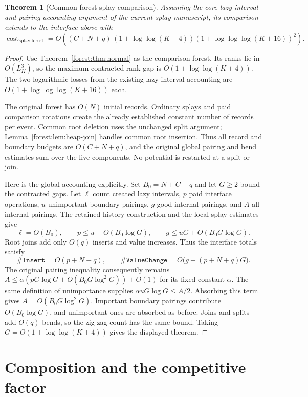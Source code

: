 \documentclass[11pt]{article}
\numberwithin{equation}{section}
\newtheorem{theorem}{Theorem}[section]
\newcommand{\cost}{\operatorname{cost}}
\begin{document}
\begin{theorem}[Common-forest splay comparison]\label{forest:thm:splay}
Assuming the core lazy-interval and pairing-accounting argument of the
current splay manuscript, its comparison extends to the interface above
with
\[
 \cost_{\mathrm{splay\ forest}}
 =O\!\left((C+N+q)\,
   (1+\log\log(K+4))
   (1+\log\log\log(K+16))^2\right).
\]
\end{theorem}

\begin{proof}
Use Theorem~\ref{forest:thm:normal} as the comparison forest. Its ranks lie in
$O(L_K^3)$, so the maximum contracted rank gap is $O(1+\log\log(K+4))$.
The two logarithmic losses from the existing lazy-interval accounting
are $O(1+\log\log\log(K+16))$ each.

The original forest has $O(N)$ initial records. Ordinary splays and
paid comparison rotations create the already established constant
number of records per event. Common root deletion uses the unchanged
split argument; Lemma~\ref{forest:lem:heap-join} handles common root insertion.
Thus all record and boundary budgets are $O(C+N+q)$, and the original
global pairing and bend estimates sum over the live components.
No potential is restarted at a split or join.

Here is the global accounting explicitly. Set $B_0=N+C+q$ and let
$G\ge2$ bound the contracted gaps. Let $\ell$ count created lazy
intervals, $p$ paid interface operations, $u$ unimportant boundary
pairings, $g$ good internal pairings, and $A$ all internal pairings.
The retained-history construction and the local splay estimates give
\[
 \ell=O(B_0),\qquad
 p\le u+O(B_0\log G),\qquad
 g\le uG+O(B_0G\log G).
\]
Root joins add only $O(q)$ inserts and value increases. Thus the
interface totals satisfy
\[
 \#\texttt{Insert}=O(p+N+q),\qquad
 \#\texttt{ValueChange}=O\bigl(g+(p+N+q)G\bigr).
\]
The original pairing inequality consequently remains
$A\le\alpha(pG\log G+O(B_0G\log^2G))+O(1)$ for its fixed constant
$\alpha$. The same definition of unimportance supplies
$\alpha uG\log G\le A/2$. Absorbing this term gives
$A=O(B_0G\log^2G)$. Important boundary pairings contribute
$O(B_0\log G)$, and unimportant ones are absorbed as before. Joins
and splits add $O(q)$ bends, so the zig-zag count has the same bound.
Taking $G=O(1+\log\log(K+4))$ gives the displayed theorem.
\end{proof}


\section{Composition and the competitive factor}
\end{document}
